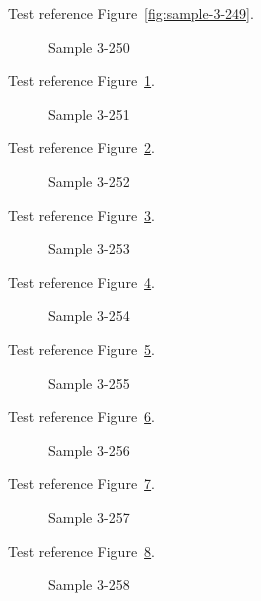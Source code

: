 Test reference Figure~\ref{fig:sample-3-249}.

\begin{figure}[tbhp]
\caption{Sample 3-250}
\label{fig:sample-3-250}
\end{figure}

Test reference Figure~\ref{fig:sample-3-250}.

\begin{figure}[tbhp]
\caption{Sample 3-251}
\label{fig:sample-3-251}
\end{figure}

Test reference Figure~\ref{fig:sample-3-251}.

\begin{figure}[tbhp]
\caption{Sample 3-252}
\label{fig:sample-3-252}
\end{figure}

Test reference Figure~\ref{fig:sample-3-252}.

\begin{figure}[tbhp]
\caption{Sample 3-253}
\label{fig:sample-3-253}
\end{figure}

Test reference Figure~\ref{fig:sample-3-253}.

\begin{figure}[tbhp]
\caption{Sample 3-254}
\label{fig:sample-3-254}
\end{figure}

Test reference Figure~\ref{fig:sample-3-254}.

\begin{figure}[tbhp]
\caption{Sample 3-255}
\label{fig:sample-3-255}
\end{figure}

Test reference Figure~\ref{fig:sample-3-255}.

\begin{figure}[tbhp]
\caption{Sample 3-256}
\label{fig:sample-3-256}
\end{figure}

Test reference Figure~\ref{fig:sample-3-256}.

\begin{figure}[tbhp]
\caption{Sample 3-257}
\label{fig:sample-3-257}
\end{figure}

Test reference Figure~\ref{fig:sample-3-257}.

\begin{figure}[tbhp]
\caption{Sample 3-258}
\label{fig:sample-3-258}
\end{figure}

